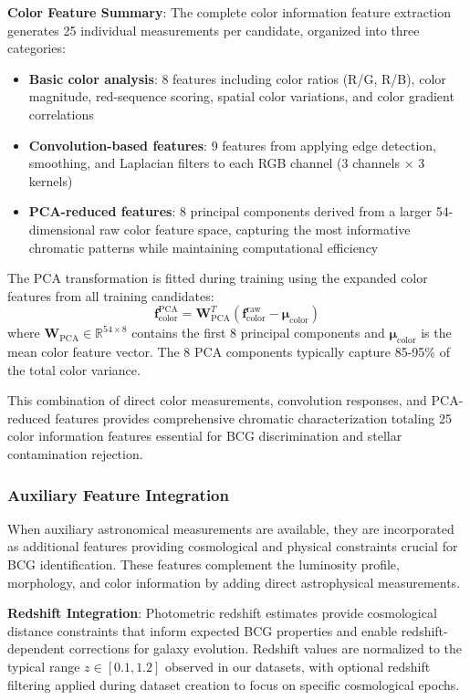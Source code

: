 \documentclass[twocolumn,10pt]{aastex631}
\begin{document}
\textbf{Color Feature Summary}: The complete color information feature extraction generates 25 individual measurements per candidate, organized into three categories:

\begin{itemize}
\item \textbf{Basic color analysis}: 8 features including color ratios (R/G, R/B), color magnitude, red-sequence scoring, spatial color variations, and color gradient correlations
\item \textbf{Convolution-based features}: 9 features from applying edge detection, smoothing, and Laplacian filters to each RGB channel (3 channels × 3 kernels)
\item \textbf{PCA-reduced features}: 8 principal components derived from a larger 54-dimensional raw color feature space, capturing the most informative chromatic patterns while maintaining computational efficiency
\end{itemize}

The PCA transformation is fitted during training using the expanded color features from all training candidates:
\begin{equation}
\mathbf{f}_{\text{color}}^{\text{PCA}} = \mathbf{W}_{\text{PCA}}^T (\mathbf{f}_{\text{color}}^{\text{raw}} - \boldsymbol{\mu}_{\text{color}})
\end{equation}
where $\mathbf{W}_{\text{PCA}} \in \mathbb{R}^{54 \times 8}$ contains the first 8 principal components and $\boldsymbol{\mu}_{\text{color}}$ is the mean color feature vector. The 8 PCA components typically capture 85-95\% of the total color variance.

This combination of direct color measurements, convolution responses, and PCA-reduced features provides comprehensive chromatic characterization totaling 25 color information features essential for BCG discrimination and stellar contamination rejection.

\subsubsection{Auxiliary Feature Integration}

When auxiliary astronomical measurements are available, they are incorporated as additional features providing cosmological and physical constraints crucial for BCG identification. These features complement the luminosity profile, morphology, and color information by adding direct astrophysical measurements.

\textbf{Redshift Integration}: Photometric redshift estimates provide cosmological distance constraints that inform expected BCG properties and enable redshift-dependent corrections for galaxy evolution. Redshift values are normalized to the typical range $z \in [0.1, 1.2]$ observed in our datasets, with optional redshift filtering applied during dataset creation to focus on specific cosmological epochs.
\end{document}
